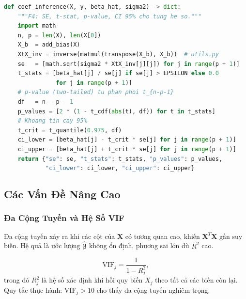 \begin{lstlisting}[language=Python, caption={Hàm \texttt{coef\_inference} - tính standard error, t-statistic, p-value và khoảng tin cậy 95\%}]
def coef_inference(X, y, beta_hat, sigma2) -> dict:
    """F4: SE, t-stat, p-value, CI 95% cho tung he so."""
    import math
    n, p = len(X), len(X[0])
    X_b  = add_bias(X)
    XtX_inv = inverse(matmul(transpose(X_b), X_b))  # utils.py
    se   = [math.sqrt(sigma2 * XtX_inv[j][j]) for j in range(p + 1)]
    t_stats = [beta_hat[j] / se[j] if se[j] > EPSILON else 0.0
               for j in range(p + 1)]
    # p-value (two-tailed) tu phan phoi t_{n-p-1}
    df   = n - p - 1
    p_values = [2 * (1 - t_cdf(abs(t), df)) for t in t_stats]
    # Khoang tin cay 95%
    t_crit = t_quantile(0.975, df)
    ci_lower = [beta_hat[j] - t_crit * se[j] for j in range(p + 1)]
    ci_upper = [beta_hat[j] + t_crit * se[j] for j in range(p + 1)]
    return {"se": se, "t_stats": t_stats, "p_values": p_values,
            "ci_lower": ci_lower, "ci_upper": ci_upper}
\end{lstlisting}

\subsection{Các Vấn Đề Nâng Cao}

\subsubsection{Đa Cộng Tuyến và Hệ Số VIF}

Đa cộng tuyến xảy ra khi các cột của $\mathbf{X}$ có tương quan cao,
khiến $\mathbf{X}^T\mathbf{X}$ gần suy biến. Hệ quả là ước lượng
$\hat{\boldsymbol{\beta}}$ không ổn định, phương sai lớn dù $R^2$ cao.

\begin{tcolorbox}[mycodebox, colback=blue!3!white, colframe=blue!40!black,
    title={\textbf{Định nghĩa 1.4} - Variance Inflation Factor (VIF)}]
\begin{equation}
    \mathrm{VIF}_j = \frac{1}{1 - R_j^2},
    \label{eq:vif}
\end{equation}
trong đó $R_j^2$ là hệ số xác định khi hồi quy biến $X_j$ theo tất cả
các biến còn lại. Quy tắc thực hành: $\mathrm{VIF}_j > 10$ cho thấy
đa cộng tuyến nghiêm trọng.
\end{tcolorbox}

